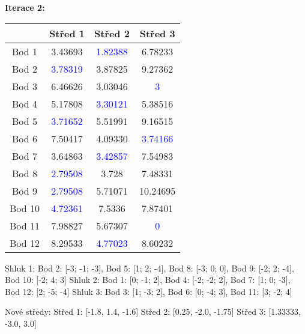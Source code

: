 \documentclass[12pt]{article}
\begin{document}
\textbf{Iterace 2:} \newline
\begin{table}[!ht]
    \renewcommand{\arraystretch}{1.3}
    \centering
    \setlength{\tabcolsep}{20pt}
    \begin{tabular}{|c|c|c|c|}
    
    \hline
        & Střed 1 & Střed 2 & Střed 3 \\ \hline
        Bod 1 & 3.43693 & \textcolor{blue}{1.82388} & 6.78233  \\ \hline
        Bod 2 & \textcolor{blue}{3.78319} & 3.87825 & 9.27362 \\ \hline
        Bod 3 & 6.46626 & 3.03046 & \textcolor{blue}{3} \\ \hline
        Bod 4 & 5.17808 & \textcolor{blue}{3.30121} & 5.38516 \\ \hline
        Bod 5 & \textcolor{blue}{3.71652} & 5.51991 & 9.16515\\ \hline
        Bod 6 & 7.50417 & 4.09330 & \textcolor{blue}{3.74166} \\ \hline
        Bod 7 & 3.64863 & \textcolor{blue}{3.42857} & 7.54983 \\ \hline
        Bod 8 & \textcolor{blue}{2.79508} & 3.728 & 7.48331\\ \hline
        Bod 9 & \textcolor{blue}{2.79508} & 5.71071 & 10.24695 \\ \hline
        Bod 10 & \textcolor{blue}{4.72361} & 7.5336 & 7.87401 \\ \hline
        Bod 11 & 7.98827 & 5.67307 & \textcolor{blue}{0} \\ \hline
        Bod 12 & 8.29533 & \textcolor{blue}{4.77023} & 8.60232\\
    \hline
    \end{tabular}
    \label{tab:iterace1}
\end{table}
\newline
Shluk 1: Bod 2: [-3; -1; -3], Bod 5: [1; 2; -4], Bod 8: [-3; 0; 0], Bod 9: [-2; 2; -4], \newline 
\null\quad\quad\qquad   Bod 10: [-2; 4; 3] \newline
Shluk 2: Bod 1: [0; -1; 2],  Bod 4: [-2; -2; 2], Bod 7: [1; 0; -3], Bod 12: [2; -5; -4] \newline
Shluk 3: Bod 3: [1; -3; 2], Bod 6: [0; -4; 3], Bod 11: [3; -2; 4]

\vspace{0.5cm}

Nové středy: \newline
Střed 1: [-1.8, 1.4, -1.6] \newline
Střed 2: [0.25, -2.0, -1.75] \newline
Střed 3: [1.33333, -3.0, 3.0] \newline
\end{document}
